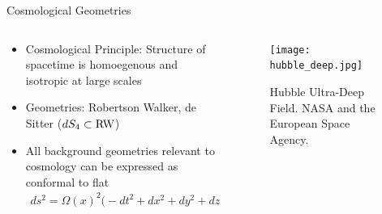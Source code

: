 \documentclass[8pt,aspectratio=1610]{beamer}
\begin{document}


\begin{frame}{Cosmological Geometries}
	\begin{columns}
	\begin{column}{0.5\linewidth}
	\begin{itemize}
		\item Cosmological Principle: Structure of spacetime is homoegenous and isotropic at large scales
		\item Geometries: Robertson Walker, de Sitter ($dS_4 \subset \rm{RW}$)
		\item All background geometries relevant to cosmology can be expressed as conformal to flat
	\begin{eqnarray*}
		ds^2 = \Omega(x)^2\big(-dt^2 + dx^2 + dy^2 + dz^2\big)
	\end{eqnarray*}
	\end{itemize}
	\end{column}
	\begin{column}{0.5\linewidth}
		\begin{figure}
			\texttt{[image: hubble\_deep.jpg]}
			{\caption*{Hubble Ultra-Deep Field. NASA and the European Space Agency.}}
		\end{figure}
	\end{column}
	\end{columns}
\end{frame}

\end{document}
